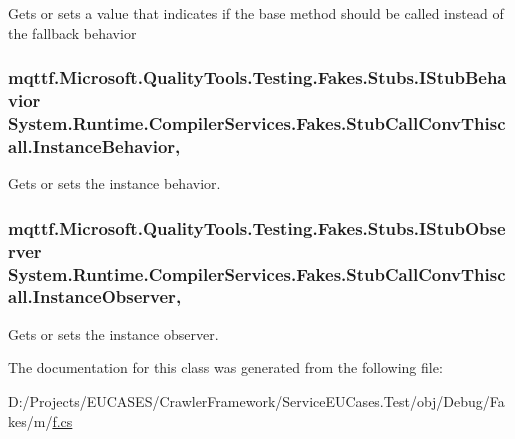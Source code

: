 Gets or sets a value that indicates if the base method should be called instead of the fallback behavior

\hypertarget{class_system_1_1_runtime_1_1_compiler_services_1_1_fakes_1_1_stub_call_conv_thiscall_a7bd897b739bd968b545d89651413eb7f}{
\subsubsection[{Instance\-Behavior}]{\setlength{\rightskip}{0pt plus 5cm}mqttf.\-Microsoft.\-Quality\-Tools.\-Testing.\-Fakes.\-Stubs.\-I\-Stub\-Behavior System.\-Runtime.\-Compiler\-Services.\-Fakes.\-Stub\-Call\-Conv\-Thiscall.\-Instance\-Behavior\hspace{0.3cm}{\ttfamily [get]}, {\ttfamily [set]}}}\label{class_system_1_1_runtime_1_1_compiler_services_1_1_fakes_1_1_stub_call_conv_thiscall_a7bd897b739bd968b545d89651413eb7f}


Gets or sets the instance behavior.

\hypertarget{class_system_1_1_runtime_1_1_compiler_services_1_1_fakes_1_1_stub_call_conv_thiscall_aecc63c4dab56fa89a486089916ab697b}{
\subsubsection[{Instance\-Observer}]{\setlength{\rightskip}{0pt plus 5cm}mqttf.\-Microsoft.\-Quality\-Tools.\-Testing.\-Fakes.\-Stubs.\-I\-Stub\-Observer System.\-Runtime.\-Compiler\-Services.\-Fakes.\-Stub\-Call\-Conv\-Thiscall.\-Instance\-Observer\hspace{0.3cm}{\ttfamily [get]}, {\ttfamily [set]}}}\label{class_system_1_1_runtime_1_1_compiler_services_1_1_fakes_1_1_stub_call_conv_thiscall_aecc63c4dab56fa89a486089916ab697b}


Gets or sets the instance observer.



The documentation for this class was generated from the following file\-:\begin{DoxyCompactItemize}
\item 
D\-:/\-Projects/\-E\-U\-C\-A\-S\-E\-S/\-Crawler\-Framework/\-Service\-E\-U\-Cases.\-Test/obj/\-Debug/\-Fakes/m/\hyperlink{m_2f_8cs}{f.\-cs}\end{DoxyCompactItemize}
